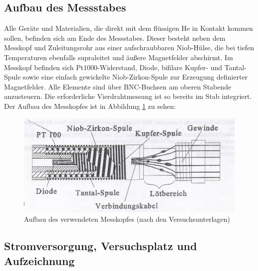 

	\subsection{Aufbau des Messstabes} %
	\label{sub:aufbau_des_messstabes}

		Alle Geräte und Materialien, die direkt mit dem flüssigen He in Kontakt kommen sollen, befinden sich am Ende des Messstabes.
		Dieser besteht neben dem Messkopf und Zuleitungsrohr aus einer aufschraubbaren Niob-Hülse, die bei tiefen Temperaturen ebenfalls supraleitet und äußere Magnetfelder abschirmt.
		Im Messkopf befinden sich Pt1000-Widerstand, Diode, bifilare Kupfer- und Tantal-Spule sowie eine einfach gewickelte Niob-Zirkon-Spule zur Erzeugung definierter Magnetfelder.
		Alle Elemente sind über BNC-Buchsen am oberen Stabende anzusteuern.
		Die erforderliche Vierdrahtmessung ist so bereits im Stab integriert.
		Der Aufbau des Messkopfes ist in Abbildung \ref{head} zu sehen:
		\begin{figure}[H]
			\center
			\includegraphics[scale=0.7]{messwerte/head.jpg}
			\caption{Aufbau des verwendeten Messkopfes (nach den Versuchsunterlagen)}
			\label{head}
		\end{figure}
	


	\subsection{Stromversorgung, Versuchsplatz und Aufzeichnung} %
	\label{sub:stromversorgung_versuchsplatz_und_aufzeichnung}
	

